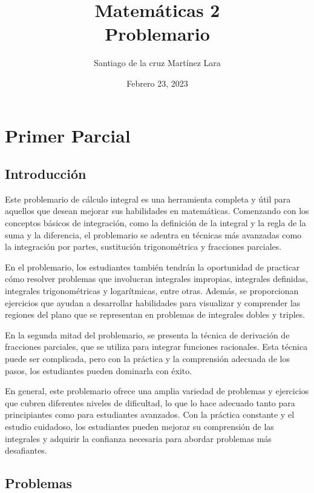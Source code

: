 \documentclass[a4paper, oneside]{report}
\title{\Huge{Matemáticas 2}\\Problemario}
\author{\huge{Santiago de la cruz Martínez Lara}}
\date{Febrero 23, 2023}
\begin{document}
\maketitle
\newpage%
\tableofcontents
\pagebreak

\chapter{Primer Parcial}
\section{Introducción}

Este problemario de cálculo integral es una herramienta completa y útil para aquellos que desean mejorar sus habilidades en matemáticas. Comenzando con los conceptos básicos de integración, como la definición de la integral y la regla de la suma y la diferencia, el problemario se adentra en técnicas más avanzadas como la integración por partes, sustitución trigonométrica y fracciones parciales.

En el problemario, los estudiantes también tendrán la oportunidad de practicar cómo resolver problemas que involucran integrales impropias, integrales definidas, integrales trigonométricas y logarítmicas, entre otras. Además, se proporcionan ejercicios que ayudan a desarrollar habilidades para visualizar y comprender las regiones del plano que se representan en problemas de integrales dobles y triples.

En la segunda mitad del problemario, se presenta la técnica de derivación de fracciones parciales, que se utiliza para integrar funciones racionales. Esta técnica puede ser complicada, pero con la práctica y la comprensión adecuada de los pasos, los estudiantes pueden dominarla con éxito.

En general, este problemario ofrece una amplia variedad de problemas y ejercicios que cubren diferentes niveles de dificultad, lo que lo hace adecuado tanto para principiantes como para estudiantes avanzados. Con la práctica constante y el estudio cuidadoso, los estudiantes pueden mejorar su comprensión de las integrales y adquirir la confianza necesaria para abordar problemas más desafiantes.

\pagebreak

\section{Problemas}
\end{document}
